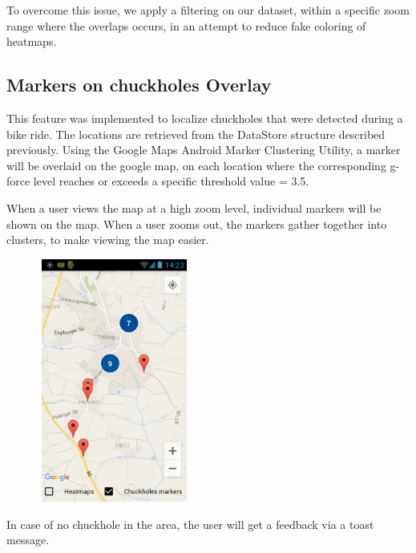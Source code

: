 \documentclass[10pt,a4paper]{article} %
\begin{document}
    To overcome this issue, we apply a filtering on our dataset, within a specific zoom range where the overlaps occurs, in an attempt to reduce fake coloring of heatmaps.
    
    
    
    \subsection{ Markers on chuckholes Overlay}
    
    This feature was implemented to localize chuckholes that were detected during a bike ride. The locations are retrieved from the DataStore structure described previously. Using the Google Maps Android Marker Clustering Utility, a marker will be overlaid on the google map, on each location where the corresponding g-force level reaches or exceeds a specific threshold value = 3.5. 
    
    When a user views the map at a high zoom level, individual markers will be shown on the map. When a user zooms out, the markers gather together into clusters, to make viewing the map easier.
    \begin{figure}[H]
    \centering
	
	  
	   
       \includegraphics[width=5cm, height=8cm]{pic3}
    
       
        \end{figure}
    
    In case of no chuckhole in the area, the user will get a feedback via a toast message.
    

    
    

    
    
    
    
\end{document}

